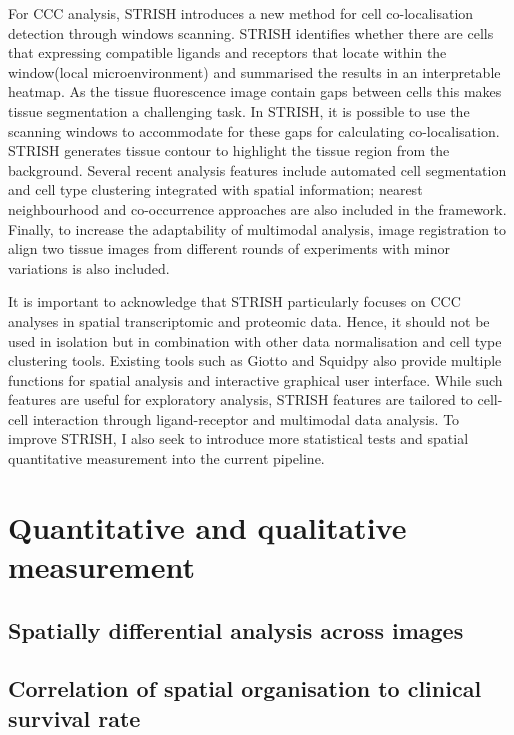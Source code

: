 For CCC analysis, STRISH introduces a new method for cell co-localisation detection through windows scanning. STRISH identifies whether there are cells that expressing compatible ligands and receptors that locate within the window(local microenvironment) and summarised the results in an interpretable heatmap. As the tissue fluorescence image contain gaps between cells this makes tissue segmentation a challenging task. In STRISH, it is possible to use the scanning windows to accommodate for these gaps for calculating co-localisation. STRISH generates tissue contour to highlight the tissue region from the background. Several recent analysis features include automated cell segmentation and cell type clustering integrated with spatial information; nearest neighbourhood and co-occurrence approaches are also included in the framework. Finally, to increase the adaptability of multimodal analysis, image registration to align two tissue images from different rounds of experiments with minor variations is also included.   

It is important to acknowledge that STRISH particularly focuses on CCC analyses in spatial transcriptomic and proteomic data. Hence, it should not be used in isolation but in combination with other data normalisation and cell type clustering tools. Existing tools such as Giotto and Squidpy also provide multiple functions for spatial analysis and interactive graphical user interface. While such features are useful for exploratory analysis, STRISH features are tailored to cell-cell interaction through ligand-receptor and multimodal data analysis. To improve STRISH, I also seek to introduce more statistical tests and spatial quantitative measurement into the current pipeline.

\section{Quantitative and qualitative measurement}
\label{Sec:3.4_validation}	%
\subsection{Spatially differential analysis across images}

\subsection{Correlation of spatial organisation to clinical survival rate}

\label{Sec:4.2_CCC_in_COAD}	%
